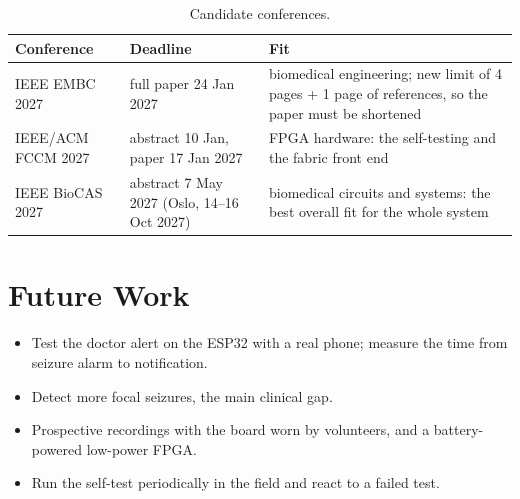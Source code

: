 \begin{table}[H]
\centering\small
\caption{Candidate conferences.}\label{tab:venues}
\begin{tabularx}{\textwidth}{@{}lP{38mm}L@{}}
\toprule
\textbf{Conference} & \textbf{Deadline} & \textbf{Fit}\\
\midrule
IEEE EMBC 2027 & full paper 24 Jan 2027 & biomedical engineering; new limit of 4 pages + 1 page of references, so the paper must
  be shortened\\
IEEE/ACM FCCM 2027 & abstract 10 Jan, paper 17 Jan 2027 & FPGA hardware: the self-testing and the fabric front end\\
IEEE BioCAS 2027 & abstract 7 May 2027 (Oslo, 14--16 Oct 2027) & biomedical circuits and systems: the best overall fit
  for the whole system\\
\bottomrule
\end{tabularx}
\end{table}

\section{Future Work}

\begin{itemize}
\item Test the doctor alert on the ESP32 with a real phone; measure the time from seizure alarm to notification.
\item Detect more focal seizures, the main clinical gap.
\item Prospective recordings with the board worn by volunteers, and a battery-powered low-power FPGA.
\item Run the self-test periodically in the field and react to a failed test.
\end{itemize}
